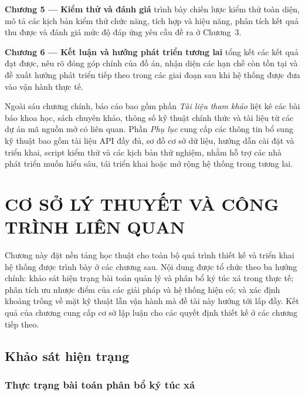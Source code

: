 ﻿\documentclass[a4paper,12pt,openany,oneside]{report}
\begin{document}
\textbf{Chương 5 --- Kiểm thử và đánh giá} trình bày chiến lược kiểm thử toàn
diện, mô tả các kịch bản kiểm thử chức năng, tích hợp và hiệu năng, phân tích
kết quả thu được và đánh giá mức độ đáp ứng yêu cầu đề ra ở Chương~3.

\textbf{Chương 6 --- Kết luận và hướng phát triển tương lai} tổng kết các kết
quả đạt được, nêu rõ đóng góp chính của đồ án, nhận diện các hạn chế còn tồn
tại và đề xuất hướng phát triển tiếp theo trong các giai đoạn sau khi hệ thống
được đưa vào vận hành thực tế.

Ngoài sáu chương chính, báo cáo bao gồm phần \textit{Tài liệu tham khảo} liệt
kê các bài báo khoa học, sách chuyên khảo, thông số kỹ thuật chính thức và tài
liệu từ các dự án mã nguồn mở có liên quan. Phần \textit{Phụ lục} cung cấp các
thông tin bổ sung kỹ thuật bao gồm tài liệu API đầy đủ, sơ đồ cơ sở dữ liệu,
hướng dẫn cài đặt và triển khai, script kiểm thử và các kịch bản thử nghiệm,
nhằm hỗ trợ các nhà phát triển muốn hiểu sâu, tái triển khai hoặc mở rộng hệ
thống trong tương lai.

\clearpage
\chapter{CƠ SỞ LÝ THUYẾT VÀ CÔNG TRÌNH LIÊN QUAN}

Chương này đặt nền tảng học thuật cho toàn bộ quá trình thiết kế và triển khai
hệ thống được trình bày ở các chương sau. Nội dung được tổ chức theo ba hướng
chính: khảo sát hiện trạng bài toán quản lý và phân bổ ký túc xá trong thực tế;
phân tích ưu nhược điểm của các giải pháp và hệ thống hiện có; và xác định
khoảng trống về mặt kỹ thuật lẫn vận hành mà đề tài này hướng tới lấp đầy. Kết
quả của chương cung cấp cơ sở lập luận cho các quyết định thiết kế ở các chương
tiếp theo.

\section{Khảo sát hiện trạng}
\label{sec:survey}

\subsection{Thực trạng bài toán phân bổ ký túc xá}
\end{document}
